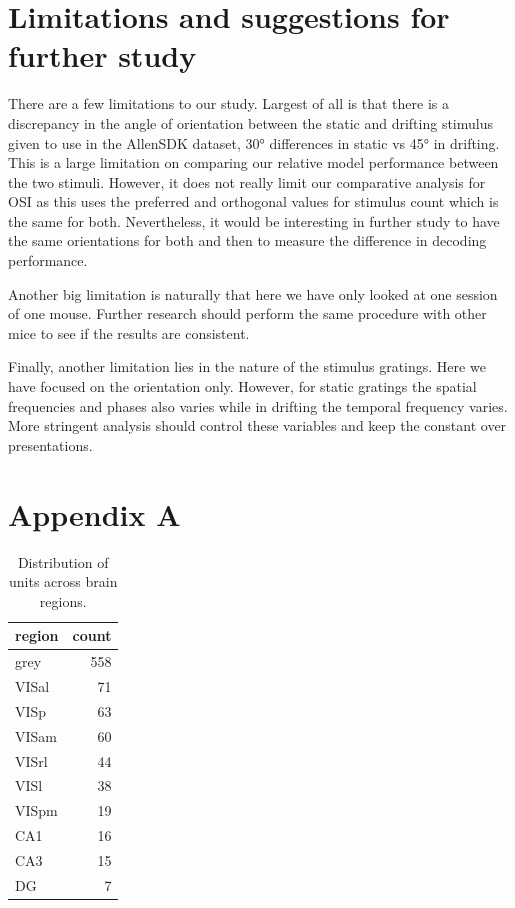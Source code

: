 \documentclass[10pt,twocolumn]{article}
\begin{document}
\section{Limitations and suggestions for further study}

There are a few limitations to our study. Largest of all is that there is a discrepancy in the angle of orientation between the static and drifting stimulus given to use in the AllenSDK dataset, 30° differences in static vs 45° in drifting. This is a large limitation on comparing our relative model performance between the two stimuli. However, it does not really limit our comparative analysis for OSI as this uses the preferred and orthogonal values for stimulus count which is the same for both. Nevertheless, it would be interesting in further study to have the same orientations for both and then to measure the difference in decoding performance.

Another big limitation is naturally that here we have only looked at one session of one mouse. Further research should perform the same procedure with other mice to see if the results are consistent.

Finally, another limitation lies in the nature of the stimulus gratings. Here we have focused on the orientation only. However, for static gratings the spatial frequencies and phases also varies while in drifting the temporal frequency varies. More stringent analysis should control these variables and keep the constant over presentations.

\newpage

\appendix

\section{Appendix A}

\begin{table}[h]
\centering
\begin{tabular}{lr}
\toprule
region & count \\
\midrule
grey   & 558 \\
VISal  &  71 \\
VISp   &  63 \\
VISam  &  60 \\
VISrl  &  44 \\
VISl   &  38 \\
VISpm  &  19 \\
CA1    &  16 \\
CA3    &  15 \\
DG     &   7 \\
\bottomrule
\end{tabular}
\caption{Distribution of units across brain regions.}
\label{tab:regions}
\end{table}
\end{document}
